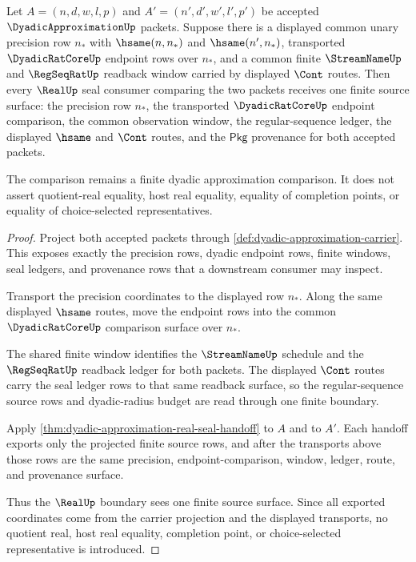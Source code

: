\begin{theorem}
\label{thm:dyadic-approximation-common-precision-refinement}
Let $A=(n,d,w,l,p)$ and $A'=(n',d',w',l',p')$ be accepted $\DyadicApproximationUp$ packets. Suppose there is a displayed common unary precision row $n_\ast$ with $\hsame(n,n_\ast)$ and $\hsame(n',n_\ast)$, transported $\DyadicRatCoreUp$ endpoint rows over $n_\ast$, and a common finite $\StreamNameUp$ and $\RegSeqRatUp$ readback window carried by displayed $\Cont$ routes. Then every $\RealUp$ seal consumer comparing the two packets receives one finite source surface: the precision row $n_\ast$, the transported $\DyadicRatCoreUp$ endpoint comparison, the common observation window, the regular-sequence ledger, the displayed $\hsame$ and $\Cont$ routes, and the $\mathsf{Pkg}$ provenance for both accepted packets.

The comparison remains a finite dyadic approximation comparison. It does not assert quotient-real equality, host real equality, equality of completion points, or equality of choice-selected representatives.
\end{theorem}
\begin{proof}
Project both accepted packets through \autoref{def:dyadic-approximation-carrier}. This exposes exactly the precision rows, dyadic endpoint rows, finite windows, seal ledgers, and provenance rows that a downstream consumer may inspect.

Transport the precision coordinates to the displayed row $n_\ast$. Along the same displayed $\hsame$ routes, move the endpoint rows into the common $\DyadicRatCoreUp$ comparison surface over $n_\ast$.

The shared finite window identifies the $\StreamNameUp$ schedule and the $\RegSeqRatUp$ readback ledger for both packets. The displayed $\Cont$ routes carry the seal ledger rows to that same readback surface, so the regular-sequence source rows and dyadic-radius budget are read through one finite boundary.

Apply \autoref{thm:dyadic-approximation-real-seal-handoff} to $A$ and to $A'$. Each handoff exports only the projected finite source rows, and after the transports above those rows are the same precision, endpoint-comparison, window, ledger, route, and provenance surface.

Thus the $\RealUp$ boundary sees one finite source surface. Since all exported coordinates come from the carrier projection and the displayed transports, no quotient real, host real equality, completion point, or choice-selected representative is introduced.
\end{proof}

